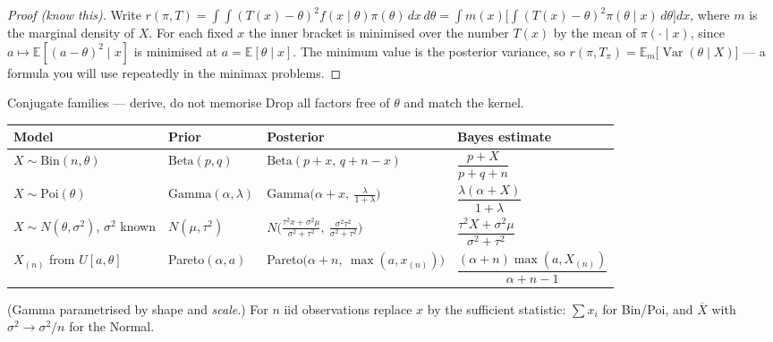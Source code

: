 \documentclass[11pt]{article}
\theoremstyle{remark}
\newcommand{\E}{\mathbb{E}}
\newcommand{\Var}{\operatorname{Var}}
\newcommand{\Xbar}{\overline{X}}
\begin{document}
\begin{proof}[Proof (know this)]
Write $r(\pi,T)=\int\!\!\int (T(x)-\theta)^2 f(x\mid\theta)\pi(\theta)\,dx\,d\theta
=\int m(x)\Big[\int (T(x)-\theta)^2\pi(\theta\mid x)\,d\theta\Big]dx$, where $m$ is the
marginal density of $X$. For each fixed $x$ the inner bracket is minimised over the number
$T(x)$ by the mean of $\pi(\cdot\mid x)$, since $a\mapsto\E[(a-\theta)^2\mid x]$ is minimised at
$a=\E[\theta\mid x]$. The minimum value is the posterior variance, so
$r(\pi,T_\pi)=\E_m\big[\Var(\theta\mid X)\big]$ --- a formula you will use repeatedly in the
minimax problems.
\end{proof}

\begin{keybox}{Conjugate families --- derive, do not memorise}
Drop all factors free of $\theta$ and match the kernel.
\begin{center}
\renewcommand{\arraystretch}{1.5}
\begin{tabular}{@{}llll@{}}
\toprule
Model & Prior & Posterior & Bayes estimate \\
\midrule
$X\sim\mathrm{Bin}(n,\theta)$ & $\mathrm{Beta}(p,q)$ & $\mathrm{Beta}(p+x,\,q+n-x)$ & $\dfrac{p+X}{p+q+n}$ \\
$X\sim\mathrm{Poi}(\theta)$ & $\mathrm{Gamma}(\alpha,\lambda)$ & $\mathrm{Gamma}\big(\alpha+x,\ \tfrac{\lambda}{1+\lambda}\big)$ & $\dfrac{\lambda(\alpha+X)}{1+\lambda}$ \\
$X\sim N(\theta,\sigma^2)$, $\sigma^2$ known & $N(\mu,\tau^2)$ & $N\!\Big(\tfrac{\tau^2x+\sigma^2\mu}{\sigma^2+\tau^2},\ \tfrac{\sigma^2\tau^2}{\sigma^2+\tau^2}\Big)$ & $\dfrac{\tau^2X+\sigma^2\mu}{\sigma^2+\tau^2}$ \\
$X_{(n)}$ from $U[a,\theta]$ & Pareto$(\alpha,a)$ & Pareto$\big(\alpha+n,\ \max(a,x_{(n)})\big)$ & $\dfrac{(\alpha+n)\max(a,X_{(n)})}{\alpha+n-1}$ \\
\bottomrule
\end{tabular}
\end{center}
(Gamma parametrised by shape and \emph{scale}.) For $n$ iid observations replace $x$ by the
sufficient statistic: $\sum x_i$ for Bin/Poi, and $\Xbar$ with $\sigma^2\!\to\!\sigma^2/n$ for
the Normal.
\end{keybox}
\end{document}
